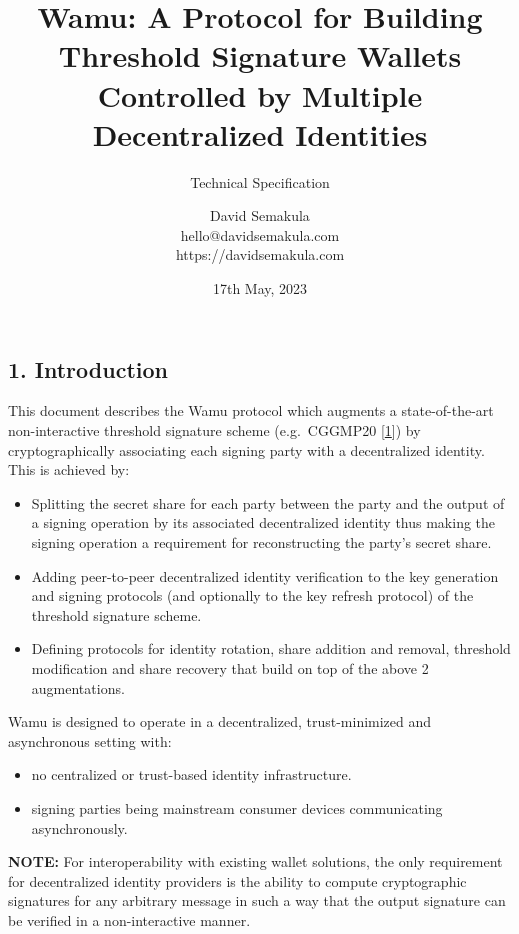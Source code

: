 \documentclass[
]{article}
\title{Wamu: A Protocol for Building Threshold Signature Wallets
Controlled by Multiple Decentralized Identities}
\subtitle{Technical Specification}
\author{David Semakula\\
hello@davidsemakula.com\\
https://davidsemakula.com}
\date{17th May, 2023}
\providecommand{\tightlist}{%
  \setlength{\itemsep}{0pt}\setlength{\parskip}{0pt}}
\begin{document}
\maketitle

{
\setcounter{tocdepth}{3}
\tableofcontents
}
\hypertarget{introduction}{%
\subsection{1. Introduction}\label{introduction}}

This document describes the Wamu protocol which augments a
state-of-the-art non-interactive threshold signature scheme
(e.g.~CGGMP20 {[}\protect\hyperlink{ref-cggmp20}{1}{]}) by
cryptographically associating each signing party with a decentralized
identity. This is achieved by:

\begin{itemize}
\tightlist
\item
  Splitting the secret share for each party between the party and the
  output of a signing operation by its associated decentralized identity
  thus making the signing operation a requirement for reconstructing the
  party's secret share.
\item
  Adding peer-to-peer decentralized identity verification to the key
  generation and signing protocols (and optionally to the key refresh
  protocol) of the threshold signature scheme.
\item
  Defining protocols for identity rotation, share addition and removal,
  threshold modification and share recovery that build on top of the
  above 2 augmentations.
\end{itemize}

Wamu is designed to operate in a decentralized, trust-minimized and
asynchronous setting with:

\begin{itemize}
\tightlist
\item
  no centralized or trust-based identity infrastructure.
\item
  signing parties being mainstream consumer devices communicating
  asynchronously.
\end{itemize}

\textbf{NOTE:} For interoperability with existing wallet solutions, the
only requirement for decentralized identity providers is the ability to
compute cryptographic signatures for any arbitrary message in such a way
that the output signature can be verified in a non-interactive manner.
\end{document}
